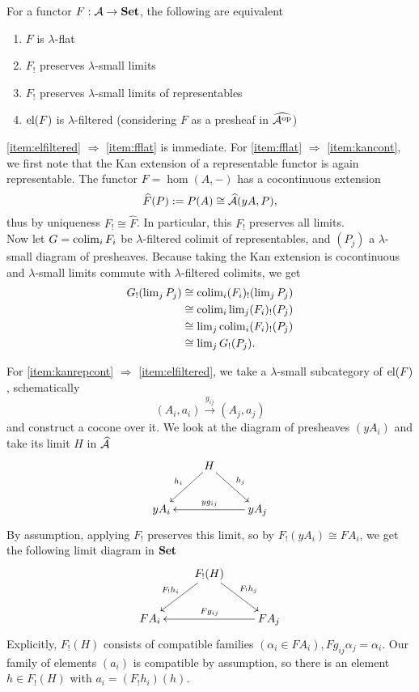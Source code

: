 \begin{Proposition}\label{prop:flat}
For a functor $F : \mathcal{A} \to \mathbf{Set}$, the following are equivalent
\begin{enumerate}
\item $F$ is $\lambda$-flat \label{item:fflat}
\item $F_!$ preserves $\lambda$-small limits \label{item:kancont}
\item $F_!$ preserves $\lambda$-small limits of representables \label{item:kanrepcont}
\item $\textrm{el}(F)$ is $\lambda$-filtered (considering $F$ as a presheaf in $\widehat{\mathcal{A}^{\textrm{op}}}$) \label{item:elfiltered}
\end{enumerate}
\end{Proposition}
\begin{Proof}
\ref{item:elfiltered} $\Rightarrow$ \ref{item:fflat} is immediate. For \ref{item:fflat} $\Rightarrow$ \ref{item:kancont}, we first note that the Kan extension of a representable functor is again representable. The functor $F=\hom(A,-)$ has a cocontinuous extension \[ \widehat F(P) := P(A) \cong \widehat{\mathcal{A}}(yA,P), \]
thus by uniqueness $F_! \cong \widehat F$. In particular, this $F_!$ preserves all limits. \\

Now let $G = \operatorname{colim}_i F_i$ be $\lambda$-filtered colimit of representables, and $(P_j)$ a $\lambda$-small diagram of presheaves. Because taking the Kan extension is cocontinuous and $\lambda$-small limits commute with $\lambda$-filtered colimits, we get
\begin{align*}
G_!(\operatorname{lim}_j P_j) &\cong \operatorname{colim}_i (F_i)_!(\operatorname{lim}_j P_j) \\
&\cong \operatorname{colim}_i \operatorname{lim}_j (F_i)_!(P_j) \\
&\cong \operatorname{lim}_j  \operatorname{colim}_i (F_i)_!(P_j) \\
&\cong \operatorname{lim}_j G_!(P_j).
\end{align*}

For \ref{item:kanrepcont} $\Rightarrow$ \ref{item:elfiltered}, we take a $\lambda$-small subcategory of $\textrm{el}(F)$, schematically
\[ (A_i,a_i) \xrightarrow{g_{ij}} (A_j,a_j) \]
and construct a cocone over it. We look at the diagram of presheaves $(yA_i)$ and take its limit $H$ in $\widehat{\mathcal{A}}$
\[
\xymatrix{
& H \ar[ld]_{h_i} \ar[rd]^{h_j} \\
yA_i & & yA_j \ar[ll]_{yg_{ij}}
}\]
By assumption, applying $F_!$ preserves this limit, so by $F_!(yA_i) \cong FA_i$, we get the following limit diagram in $\mathbf{Set}$
\[
\xymatrix{
& F_!(H) \ar[ld]_{F_!h_i} \ar[rd]^{F_!h_j} \\
FA_i & & FA_j \ar[ll]_{Fg_{ij}}
}\]
Explicitly, $F_!(H)$ consists of compatible families $(\alpha_i \in FA_i), Fg_{ij}\alpha_j = \alpha_i$. Our family of elements $(a_i)$ is compatible by assumption, so there is an element $h \in F_!(H)$ with $a_i = (F_!h_i)(h)$. \\


\end{Proof}
